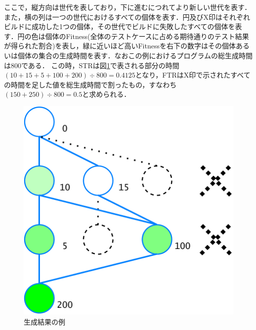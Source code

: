 \documentclass[uplatex,dvipdfmx,a4paper]{jsarticle}
\begin{document}
ここで，縦方向は世代を表しており，下に進むにつれてより新しい世代を表す．また，横の列は一つの世代におけるすべての個体を表す．円及びX印はそれぞれビルドに成功した1つの個体，その世代でビルドに失敗したすべての個体を表す．円の色は個体のFitness(全体のテストケースに占める期待通りのテスト結果が得られた割合)を表し，緑に近いほど高いFitnessを右下の数字はその個体あるいは個体の集合の生成時間を表す．なおこの例におけるプログラムの総生成時間は800である．
この時，STRは図\ref{fig:example_STR}で表される部分の時間$(10 + 15 + 5 + 100 + 200) \div 800 = 0.4125$となり，FTRはX印で示されたすべての時間を足した値を総生成時間で割ったもの，すなわち$(150 + 250) \div 800 = 0.5$と求められる．
\begin{figure}[t]
  \centering
  \includegraphics[width=\linewidth]{fig/astSample_STR.pdf}
  \caption{生成結果の例}
  \label{fig:example_STR}
\end{figure}
\end{document}
